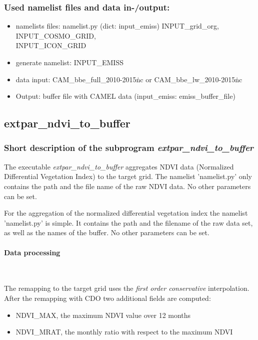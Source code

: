 \documentclass[a4paper,10pt,DIV14,BCOR1cm,titlepage,twoside]{scrartcl}
\begin{document}
\subsubsection{Used namelist files and data in-/output:}
\begin{itemize}
  \item namelists files: namelist.py (dict: input\_emiss) INPUT\_grid\_org, INPUT\_COSMO\_GRID, \\
          INPUT\_ICON\_GRID
  \item generate namelist: INPUT\_EMISS
  \item data input: CAM\_bbe\_full\_2010-2015\.nc or CAM\_bbe\_lw\_2010-2015\.nc
  \item Output: buffer file with CAMEL data (input\_emiss: emiss\_buffer\_file)
\end{itemize}

\subsection{extpar\_ndvi\_to\_buffer}\label{extpar_ndvi_to_buffer}
\subsubsection{Short description of the subprogram \textit{extpar\_ndvi\_to\_buffer}}
The executable \textit{extpar\_ndvi\_to\_buffer} aggregates NDVI data (Normalized Differential Vegetation Index) to the target grid. The namelist 'namelist.py' only contains the path and the file name of the raw NDVI data. No other parameters can be set. \par\medskip\noindent
For the aggregation of the normalized differential vegetation index the namelist 'namelist.py' is simple. It contains the path and the filename of the raw data set, as well as the names of the buffer. No other parameters can be set. \par\medskip\noindent
\paragraph{Data processing} \ \par\medskip\noindent
The remapping to the target grid uses the \textit{first order conservative} interpolation. After the remapping with CDO two additional fields are computed:
\begin{itemize}
  \item NDVI\_MAX, the maximum NDVI value over 12 months
  \item NDVI\_MRAT, the monthly ratio with respect to the maximum NDVI
\end{itemize}
\end{document}
